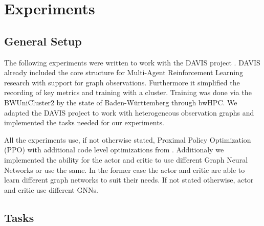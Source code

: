 
\chapter{Experiments}
\label{ch:Experiments}
\section{General Setup}
The following experiments were written to work with the DAVIS project \citet{DAVIS2021}. DAVIS already included the core structure for Multi-Agent Reinforcement Learning research with support for graph observations. Furthermore it simplified the recording of key metrics and training with a cluster. Training was done via the BWUniCluster2 by the state of Baden-Württemberg through bwHPC. We adapted the DAVIS project to work with heterogeneous observation graphs and implemented the tasks needed for our experiments. \par

All the experiments use, if not otherwise stated, Proximal Policy Optimization (PPO) \citet{SchulmanWDRK17} with additional code level optimizations from \citet{PPOHacks2020}. Additionaly we implemented the ability for the actor and critic to use different Graph Neural Networks or use the same. In the former case the actor and critic are able to learn different graph networks to suit their needs. If not stated otherwise, actor and critic use different GNNs.



\section{Tasks}
